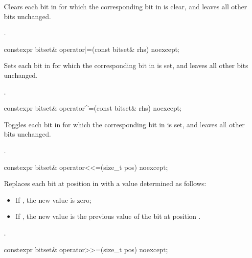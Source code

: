 \begin{itemdescr}
\pnum
\effects
Clears each bit in
for which the corresponding bit in  is clear, and leaves all other bits unchanged.

\pnum
\returns
{}.
\end{itemdescr}

%
\begin{itemdecl}
constexpr bitset& operator|=(const bitset& rhs) noexcept;
\end{itemdecl}

\begin{itemdescr}
\pnum
\effects
Sets each bit in
for which the corresponding bit in  is set, and leaves all other bits unchanged.

\pnum
\returns
{}.
\end{itemdescr}

%
\begin{itemdecl}
constexpr bitset& operator^=(const bitset& rhs) noexcept;
\end{itemdecl}

\begin{itemdescr}
\pnum
\effects
Toggles each bit in
for which the corresponding bit in  is set, and leaves all other bits unchanged.

\pnum
\returns
{}.
\end{itemdescr}

%
\begin{itemdecl}
constexpr bitset& operator<<=(size_t pos) noexcept;
\end{itemdecl}

\begin{itemdescr}
\pnum
\effects
Replaces each bit at position  in
with a value determined as follows:

\begin{itemize}
\item
If , the new value is zero;
\item
If , the new value is the previous
value of the bit at position .
\end{itemize}

\pnum
\returns
{}.
\end{itemdescr}

%
\begin{itemdecl}
constexpr bitset& operator>>=(size_t pos) noexcept;
\end{itemdecl}

